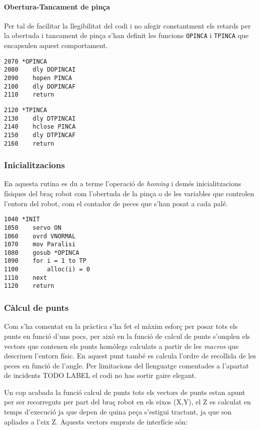 \paragraph{Obertura-Tancament de pinça}
Per tal de facilitar la llegibilitat del codi i no afegir constantment
els retards per la obertuda i tancament de pinça s'han definit les funcions
\texttt{OPINCA} i \texttt{TPINCA} que encapsulen aquest comportament.

\begin{verbatim}
2070 *OPINCA
2080    dly DOPINCAI
2090    hopen PINCA
2100    dly DOPINCAF
2110    return
\end{verbatim}
\begin{verbatim}
2120 *TPINCA
2130    dly DTPINCAI
2140    hclose PINCA
2150    dly DTPINCAF
2160    return
\end{verbatim}

\subsubsection{Inicialitzacions}
En aquesta rutina es du a terme l'operació de \emph{homing} i demés
inicialitzacions físiques del braç robot com l'obertuda de la pinça
o de les variables que controlen l'entorn del robot, com el 
contador de peces que s'han posat a cada palé.

\begin{verbatim}
1040 *INIT
1050    servo ON
1060    ovrd VNORMAL
1070    mov Paralisi
1080    gosub *OPINCA
1090    for i = 1 to TP
1100        alloc(i) = 0
1110    next
1120    return
\end{verbatim}

\subsubsection{Càlcul de punts}
Com s'ha comentat en la pràctica s'ha fet el màxim esforç per posar tots els
punts en funció d'uns pocs, per això en la funció de calcul de punts s'omplen
els vectors que contenen els punts homòlegs calculats a partir de les
\emph{macros} que descriuen l'entorn físic. En aquest punt també es calcula
l'ordre de recollida de les peces en funció de l'angle. Per limitacions del
llenguatge comentades a l'apartat de incidents TODO LABEL el codi no has
sortir gaire elegant.

Un cop acabada la funció calcul de punts tots els vectors de punts estan apunt
per ser recorreguts per part del braç robot en els eixos (X,Y), el Z es
calculat en temps d'execució ja que depen de quina peça s'estigui tractant,
ja que son apliades a l'eix Z.
Aquests vectors emprats de interfície són:


